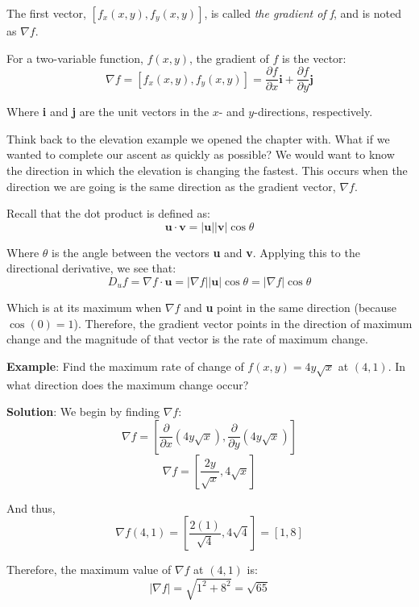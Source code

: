 The first vector, $\left[ f_x(x, y), f_y(x, y) \right]$, is called \textit{the 
gradient of f}, and is noted as $\nabla f$. 

\begin{mdframed}[style = important, frametitle = {The Gradient}]
For a two-variable function, $f(x, y)$, the gradient of $f$ is the vector:
$$\nabla f = \left[ f_x(x, y), f_y(x, y) \right] = \frac{\partial f}{\partial 
x} \textbf{i} + \frac{\partial f}{\partial y} \textbf{j}$$

Where \textbf{i} and \textbf{j} are the unit vectors in the $x$- and 
$y$-directions, respectively.
\end{mdframed}

Think back to the elevation example we opened the chapter with. What if we 
wanted to complete our ascent as quickly as possible? We would want to 
know the direction in which the elevation is changing the fastest. This occurs 
when the direction we are going is the same direction as the gradient vector, 
$\nabla f$. 

Recall that the dot product is defined as:
$$\textbf{u} \cdot \textbf{v} = \left| \textbf{u} \right| \left| \textbf{v} 
\right| \cos{ \theta}$$

Where $\theta$ is the angle between the vectors \textbf{u} and \textbf{v}. 
Applying this to the directional derivative, we see that:
$$D_u f = \nabla f \cdot \textbf{u} = \left| \nabla f \right| \left| 
\textbf{u} \right| \cos{\theta} = \left| \nabla f \right| \cos{\theta}$$

Which is at its maximum when $\nabla f$ and \textbf{u} point in the same 
direction (because $\cos{\left( 0 \right)} = 1$). Therefore, the gradient 
vector points in the direction of maximum change and the magnitude of that 
vector is the rate of maximum change. 

\textbf{Example}: Find the maximum rate of change of $f(x, y) = 4y\sqrt{x}$ at 
$(4, 1)$. In what direction does the maximum change occur?

\textbf{Solution}: We begin by finding $\nabla f$:
$$\nabla f = \left[ \frac{\partial}{\partial x} \left( 4y\sqrt{x} \right), 
\frac{\partial}{\partial y} \left( 4y\sqrt{x} \right) \right]$$
$$\nabla f = \left[ \frac{2y}{\sqrt{x}}, 4\sqrt{x} \right]$$

And thus, 
$$\nabla f(4, 1) = \left[ \frac{2(1)}{\sqrt{4}}, 4\sqrt{4} \right] = \left[ 1, 
8 \right]$$

Therefore, the maximum value of $\nabla f$ at $(4, 1)$ is:
$$\left| \nabla f \right| = \sqrt{1^2 + 8^2} = \sqrt{65}$$

